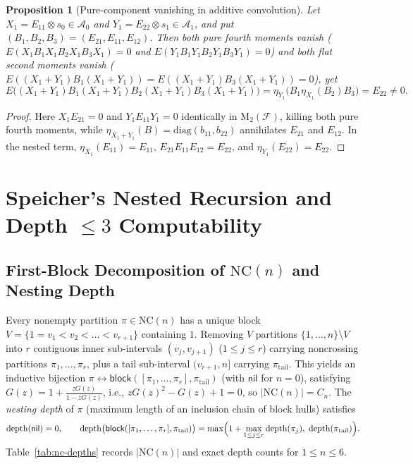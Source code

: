 \documentclass[11pt,a4paper]{article}
\newtheorem{proposition}[theorem]{Proposition}
\theoremstyle{definition}
\newcommand{\NC}{\mathrm{NC}}
\newcommand{\Mat}{\mathrm{M}}
\begin{document}
\begin{proposition}[Pure-component vanishing in additive convolution]\label{prop:pure-vanish}
Let $X_1 = E_{11} \otimes s_0 \in \mathcal{A}_0$ and $Y_1 = E_{22} \otimes s_1 \in \mathcal{A}_1$, and put $(B_1, B_2, B_3) = (E_{21}, E_{11}, E_{12})$. Then both pure fourth moments vanish ($E(X_1 B_1 X_1 B_2 X_1 B_3 X_1) = 0$ and $E(Y_1 B_1 Y_1 B_2 Y_1 B_3 Y_1) = 0$) and both flat second moments vanish ($E((X_1+Y_1) B_1 (X_1+Y_1)) = E((X_1+Y_1) B_3 (X_1+Y_1)) = 0$), yet
\[
E\bigl((X_1 + Y_1) B_1 (X_1 + Y_1) B_2 (X_1 + Y_1) B_3 (X_1 + Y_1)\bigr) = \eta_{Y_1}\bigl(B_1 \eta_{X_1}(B_2) B_3\bigr) = E_{22} \neq 0.
\]
\end{proposition}
\begin{proof}
Here $X_1 E_{21} = 0$ and $Y_1 E_{11} Y_1 = 0$ identically in $\Mat_2(\mathcal{F})$, killing both pure fourth moments, while $\eta_{X_1 + Y_1}(B) = \mathrm{diag}(b_{11}, b_{22})$ annihilates $E_{21}$ and $E_{12}$. In the nested term, $\eta_{X_1}(E_{11}) = E_{11}$, $E_{21} E_{11} E_{12} = E_{22}$, and $\eta_{Y_1}(E_{22}) = E_{22}$.
\end{proof}

\section{Speicher's Nested Recursion and Depth \texorpdfstring{$\le 3$}{<= 3} Computability}\label{sec:speicher}

\subsection{First-Block Decomposition of \texorpdfstring{$\NC(n)$}{NC(n)} and Nesting Depth}
Every nonempty partition $\pi \in \NC(n)$ has a unique block $V = \{1 = v_1 < v_2 < \dots < v_{r+1}\}$ containing $1$. Removing $V$ partitions $\{1, \dots, n\} \setminus V$ into $r$ contiguous inner sub-intervals $(v_j, v_{j+1})$ ($1 \le j \le r$) carrying noncrossing partitions $\pi_1, \dots, \pi_r$, plus a tail sub-interval $(v_{r+1}, n]$ carrying $\pi_{\mathrm{tail}}$. This yields an inductive bijection $\pi \leftrightarrow \mathsf{block}([\pi_1, \dots, \pi_r], \pi_{\mathrm{tail}})$ (with $\mathsf{nil}$ for $n = 0$), satisfying $G(z) = 1 + \frac{z G(z)}{1 - z G(z)}$, i.e., $z G(z)^2 - G(z) + 1 = 0$, so $|\NC(n)| = C_n$. The \emph{nesting depth} of $\pi$ (maximum length of an inclusion chain of block hulls) satisfies
\[
\mathrm{depth}(\mathsf{nil}) = 0, \qquad \mathrm{depth}\bigl(\mathsf{block}([\pi_1, \dots, \pi_r], \pi_{\mathrm{tail}})\bigr) = \max\Bigl(1 + \max_{1 \le j \le r} \mathrm{depth}(\pi_j),\; \mathrm{depth}(\pi_{\mathrm{tail}})\Bigr).
\]
Table~\ref{tab:nc-depths} records $|\NC(n)|$ and exact depth counts for $1 \le n \le 6$.
\end{document}
